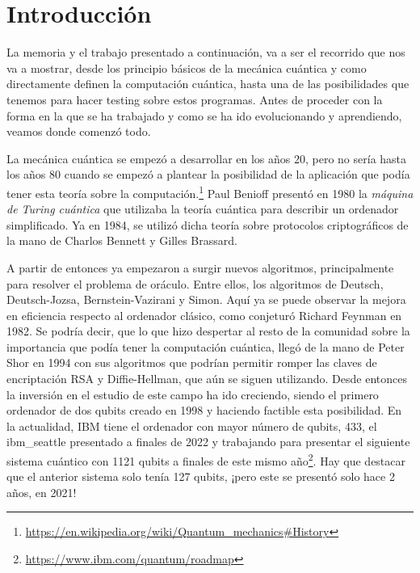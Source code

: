 \cleardoublepage

\chapter{Introducción}
\label{Cap1:Intro}
La memoria y el trabajo presentado a continuación, va a ser el recorrido que nos va a mostrar, desde los principio básicos de la mecánica cuántica y como directamente definen la computación cuántica, hasta una de las posibilidades que tenemos para hacer testing sobre estos programas. Antes de proceder con la forma en la que se ha trabajado y como se ha ido evolucionando y aprendiendo, veamos donde comenzó todo. \newline

La mecánica cuántica se empezó a desarrollar en los años 20, pero no sería hasta los años 80 cuando se empezó a plantear la posibilidad de la aplicación que podía tener esta teoría sobre la computación\cite{B:QuantumScientist:2008}.\footnote{\url{https://en.wikipedia.org/wiki/Quantum_mechanics#History}} Paul Benioff presentó en 1980 la \textit{máquina de Turing cuántica} que utilizaba la teoría cuántica para describir un ordenador simplificado. Ya en 1984, se utilizó dicha teoría sobre protocolos criptográficos de la mano de Charlos Bennett y Gilles Brassard. \newline

A partir de entonces ya empezaron a surgir nuevos algoritmos, principalmente para resolver el problema de oráculo. Entre ellos, los algoritmos de Deutsch, Deutsch-Jozsa, Bernstein-Vazirani y Simon. Aquí ya se puede observar la mejora en eficiencia respecto al ordenador clásico, como conjeturó Richard Feynman en 1982\cite{AR:Feynman:1982}. Se podría decir, que lo que hizo despertar al resto de la comunidad sobre la importancia que podía tener la computación cuántica, llegó de la mano de Peter Shor en 1994 con sus algoritmos que podrían permitir romper las claves de encriptación RSA y Diffie-Hellman, que aún se siguen utilizando. Desde entonces la inversión en el estudio de este campo ha ido creciendo, siendo el primero ordenador de dos qubits creado en 1998 y haciendo factible esta posibilidad. En la actualidad, IBM tiene el ordenador con mayor número de qubits, 433, el ibm\_seattle presentado a finales de 2022 y trabajando para presentar el siguiente sistema cuántico con 1121 qubits a finales de este mismo año\footnote{\url{https://www.ibm.com/quantum/roadmap}}. Hay que destacar que el anterior sistema solo tenía 127 qubits, ¡pero este se presentó solo hace 2 años, en 2021! \newline

